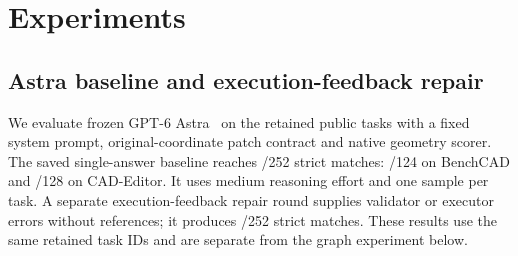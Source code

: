 \section{Experiments}
\label{sec:experiments}
\subsection{Astra baseline and execution-feedback repair}
We evaluate frozen GPT-6 Astra~\cite{openai2026astra} on the retained public tasks with a fixed system prompt, original-coordinate patch contract and native geometry scorer. The saved single-answer baseline reaches \paAstra/252 strict matches: \paAstraBench/124 on BenchCAD and \paAstraEditor/128 on CAD-Editor. It uses medium reasoning effort and one sample per task. A separate execution-feedback repair round supplies validator or executor errors without references; it produces \paRepairAfter/252 strict matches. These results use the same retained task IDs and are separate from the graph experiment below.

